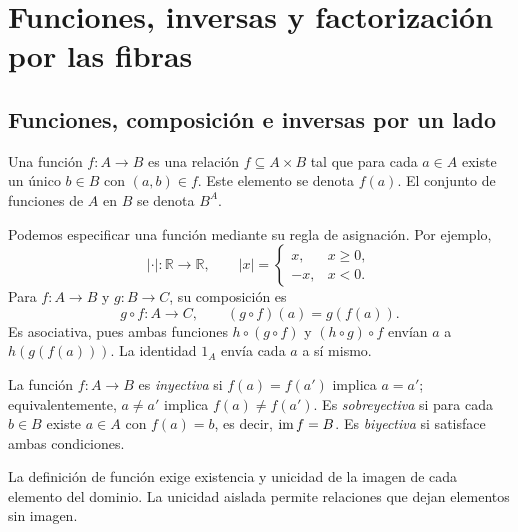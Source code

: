 \section{Funciones, inversas y factorización por las fibras}\label{sec:preliminares-funciones}

\subsection{Funciones, composición e inversas por un lado}\label{tema:1-2-1}\label{tema:1-2-2}
\begin{defi}
Una función $f:A\to B$ es una relación $f\subseteq A\times B$ tal que para cada $a\in A$ existe un único $b\in B$ con $(a,b)\in f$. Este elemento se denota $f(a)$. El conjunto de funciones de $A$ en $B$ se denota $B^A$.
\end{defi}
Podemos especificar una función mediante su regla de asignación. Por ejemplo,
\[
|\cdot|:\mathbb R\to\mathbb R,\qquad
|x|=\begin{cases}x,&x\ge0,\\-x,&x<0.\end{cases}
\]
Para $f:A\to B$ y $g:B\to C$, su composición es
\[
g\circ f:A\to C,\qquad (g\circ f)(a)=g(f(a)).
\]
Es asociativa, pues ambas funciones $h\circ(g\circ f)$ y $(h\circ g)\circ f$ envían $a$ a $h(g(f(a)))$. La identidad $1_A$ envía cada $a$ a sí mismo.

\begin{defi}
La función $f:A\to B$ es \emph{inyectiva} si $f(a)=f(a')$ implica $a=a'$; equivalentemente, $a\ne a'$ implica $f(a)\ne f(a')$. Es \emph{sobreyectiva} si para cada $b\in B$ existe $a\in A$ con $f(a)=b$, es decir, $\operatorname{im} f=B$. Es \emph{biyectiva} si satisface ambas condiciones.
\end{defi}

\begin{obs}
La definición de función exige existencia y unicidad de la imagen de cada elemento del dominio. La unicidad aislada permite relaciones que dejan elementos sin imagen.
\end{obs}

